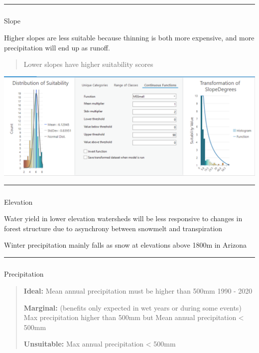 \documentclass[
  number]{elsarticle}
\makeatletter
\let\oldsubparagraph\subparagraph
\renewcommand{\subparagraph}{
    \@ifstar
      \xxxSubParagraphStar
      \xxxSubParagraphNoStar
  }
\newcommand{\xxxSubParagraphStar}[1]{\oldsubparagraph*{#1}\mbox{}}
\newcommand{\xxxSubParagraphNoStar}[1]{\oldsubparagraph{#1}\mbox{}}
\makeatother
\begin{document}
\begin{center}\rule{0.5\linewidth}{0.5pt}\end{center}

\subparagraph{Slope}\label{slope}

Higher slopes are less suitable because thinning is both more expensive,
and more precipitation will end up as runoff.

\begin{quote}
Lower slopes have higher suitability scores
\end{quote}

\includegraphics{images/Slope_suitability.PNG}

\begin{center}\rule{0.5\linewidth}{0.5pt}\end{center}

\subparagraph{Elevation}\label{elevation}

Water yield in lower elevation watersheds will be less responsive to
changes in forest structure due to asynchrony between snowmelt and
transpiration \citep{biederman2022}

Winter precipitation mainly falls as snow at elevations above 1800m in
Arizona \citep{friederici2013}

\begin{center}\rule{0.5\linewidth}{0.5pt}\end{center}

\subparagraph{Precipitation}\label{precipitation}

\begin{quote}
\textbf{Ideal:} Mean annual precipitation must be higher than 500mm 1990
- 2020

\textbf{Marginal:} (benefits only expected in wet years or during some
events) Max precipitation higher than 500mm but Mean annual
precipitation \textless{} 500mm

\textbf{Unsuitable:} Max annual precipitation \textless{} 500mm
\end{quote}
\end{document}
